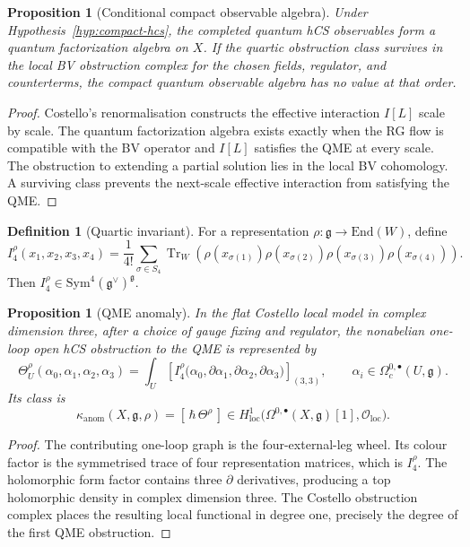\documentclass[11pt]{amsart}
\newtheorem{proposition}[theorem]{Proposition}
\theoremstyle{definition}
\newtheorem{definition}[theorem]{Definition}
\theoremstyle{remark}
\providecommand{\End}{\mathrm{End}}
\providecommand{\Sym}{\mathrm{Sym}}
\providecommand{\cO}{\mathcal O}
\providecommand{\fg}{\mathfrak g}
\providecommand{\kanom}{\kappa_{\mathrm{anom}}}
\begin{document}
\begin{proposition}[Conditional compact observable algebra]
\label{prop:compact-observables}
Under Hypothesis~\ref{hyp:compact-hcs}, the completed quantum hCS
observables form a quantum factorization algebra on $X$. If the
quartic obstruction class survives in the local BV obstruction complex
for the chosen fields, regulator, and counterterms, the compact quantum
observable algebra has no value at that order.
\end{proposition}

\begin{proof}
Costello's renormalisation constructs the effective interaction
$I[L]$ scale by scale. The quantum factorization algebra exists exactly
when the RG flow is compatible with the BV operator and $I[L]$
satisfies the QME at every scale. The obstruction to extending a
partial solution lies in the local BV cohomology. A surviving class
prevents the next-scale effective interaction from satisfying the QME.
\end{proof}

\begin{definition}[Quartic invariant]
\label{def:quartic-invariant}
For a representation $\rho:\fg\to\End(W)$, define
\[
  I_4^\rho(x_1,x_2,x_3,x_4)
  =
  \frac1{4!}\sum_{\sigma\in S_4}
  \operatorname{Tr}_W\!\left(
    \rho(x_{\sigma(1)})\rho(x_{\sigma(2)})
    \rho(x_{\sigma(3)})\rho(x_{\sigma(4)})\right).
\]
Then $I_4^\rho\in\Sym^4(\fg^\vee)^\fg$.
\end{definition}

\begin{proposition}[QME anomaly]
\label{prop:qme-anomaly}
In the flat Costello local model in complex dimension three, after a
choice of gauge fixing and regulator, the nonabelian one-loop open hCS
obstruction to the QME is represented by
\[
  \Theta^\rho_U(\alpha_0,\alpha_1,\alpha_2,\alpha_3)
  =
  \int_U
  \left[
  I_4^\rho\bigl(
    \alpha_0,\partial\alpha_1,\partial\alpha_2,\partial\alpha_3
  \bigr)\right]_{(3,3)},
  \qquad \alpha_i\in\Omega_c^{0,\bullet}(U,\fg).
\]
Its class is
\[
  \kanom(X,\fg,\rho)
  =
  [\,\hbar\,\Theta^\rho\,]\in
  H^1_{\mathrm{loc}}
  \bigl(\Omega^{0,\bullet}(X,\fg)[1],\cO_{\mathrm{loc}}\bigr).
\]
\end{proposition}

\begin{proof}
The contributing one-loop graph is the four-external-leg wheel. Its
colour factor is the symmetrised trace of four representation matrices,
which is $I_4^\rho$. The holomorphic form factor contains three
$\partial$ derivatives, producing a top holomorphic density in complex
dimension three. The Costello obstruction complex places the resulting
local functional in degree one, precisely the degree of the first QME
obstruction.
\end{proof}
\end{document}
